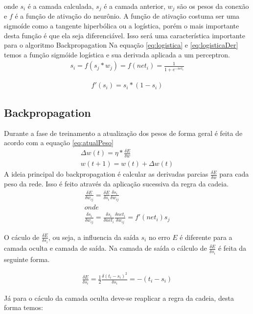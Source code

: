 \documentclass[
	article,			%
	11pt,				%
	oneside,			%
	a4paper,			%
	english,			%
	brazil,				%
	sumario=tradicional
	]{abntex2}
\begin{document}
onde $s_i$ é a camada calculada, $s_j$ é a camada anterior, $w_j$ são os pesos
da conexão e $f$ é a função de ativação do neurônio. A função de ativação
costuma ser uma sigmoíde como a tangente hiperbólica ou a logística, porém o
mais importante desta função é que ela seja diferenciável. Isso será uma
característica importante para o algoritmo Backpropagation Na equação
\ref{eq:logistica} e \ref{eq:logisticaDer} temos a função sigmóide logística e
sua derivada aplicada a um perceptron.
\begin{align}
	s_i=f(s_j*w_j)=f(net_i)=\frac{1}{1+e^{-net_i}}
\label{eq:logistica}
\end{align}

\begin{align}
	f'(s_i)=s_i*(1-s_i)
\label{eq:logisticaDer}
\end{align} 

\subsection{Backpropagation}
Durante a fase de treinamento a atualização dos pesos de forma geral é feita de
acordo com a equação \ref{eq:atualPeso}
\begin{align}
	\Delta w(t)= \eta*\frac{\delta E}{\delta w} \\
	w(t+1)=w(t)+\Delta w(t)
\label{eq:atualPeso}
\end{align}
A ideia principal do backpropagation é calcular as derivadas parcias
$\frac{\delta E}{\delta w}$ para cada peso da rede. Isso é feito através da
aplicação sucessiva da regra da cadeia.
\begin{align}
\frac{\delta E}{\delta w_{ij}}=
\frac{\delta E}{\delta s_i}
\frac{\delta s_i}{\delta w_{ij}}
\\ onde \\
\frac{\delta s_i}{\delta w_{ij}}=
\frac{\delta s_i}{\delta net_i}
\frac{\delta net_i}{\delta w_{ij}}=
f'(net_i)s_j
\end{align}

O cáculo de $\frac{\delta E}{\delta s_i}$, ou seja, a influencia da saída
$s_i$ no erro $E$ é diferente para a camada oculta e camada de saída.
Na camada de saída o cálculo de $\frac{\delta E}{\delta s_i}$ é feita da
seguinte forma.

\begin{align}
\frac{\delta E}{\delta s_i}=
\frac{1}{2}\frac{\delta (t_i-s_i)^2}{\delta s_i}=-(t_i-s_i)
\end{align}

Já para o cáculo da camada oculta deve-se reaplicar a regra da cadeia, desta
forma temos:
\end{document}
